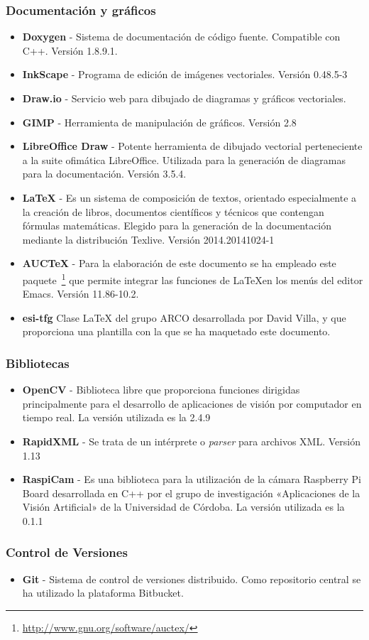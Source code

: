 \subsubsection{Documentación y gráficos}
\begin{itemize}
\item \textbf{Doxygen} - Sistema de documentación de código fuente. Compatible con C++. Versión 1.8.9.1.
\item \textbf{InkScape} - Programa de edición de imágenes vectoriales. Versión 0.48.5-3
\item \textbf{Draw.io} - Servicio web para dibujado de diagramas y gráficos vectoriales.
\item \textbf{GIMP} - Herramienta de manipulación de gráficos. Versión 2.8
\item \textbf{LibreOffice Draw} - Potente herramienta de dibujado vectorial perteneciente a la suite ofimática LibreOffice. Utilizada para la generación de diagramas para la documentación. Versión 3.5.4.
\item \textbf{\LaTeX{}} - Es un sistema de composición de textos, orientado especialmente a la creación de libros, documentos científicos y técnicos que contengan fórmulas matemáticas. Elegido para la generación de la documentación mediante la distribución Texlive. Versión 2014.20141024-1
\item \textbf{AUCTeX} -  Para la elaboración de este documento se ha empleado este paquete~\footnote{\url{http://www.gnu.org/software/auctex/}} que permite integrar las funciones de \LaTeX en los menús del editor Emacs. Versión 11.86-10.2.
\item  \textbf{esi-tfg} Clase \LaTeX{} del grupo \acs{ARCO} desarrollada por David Villa, y que proporciona una plantilla con la que se ha maquetado este documento.
\end{itemize}


\subsubsection{Bibliotecas}
\begin{itemize}
\item \textbf{OpenCV} - Biblioteca libre que proporciona funciones dirigidas principalmente para el desarrollo de aplicaciones de visión por computador en tiempo real. La versión utilizada es la 2.4.9
\item \textbf{RapidXML} - Se trata de un intérprete o \textit{parser} para archivos XML. Versión 1.13
\item \textbf{RaspiCam} - Es una biblioteca para la utilización de la cámara Raspberry Pi Board desarrollada en C++ por el grupo de investigación «Aplicaciones de la Visión Artificial» de la Universidad de Córdoba. La versión utilizada es la 0.1.1 
\end{itemize}

\subsubsection{Control de Versiones}
\begin{itemize}
\item \textbf{Git} - Sistema de control de versiones distribuido. Como repositorio central se ha utilizado la plataforma Bitbucket.
\end{itemize}
